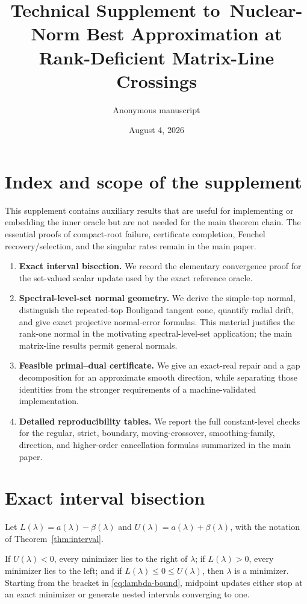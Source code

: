 \documentclass[10pt]{article}
\title{\textbf{Technical Supplement to}\
\textbf{Nuclear-Norm Best Approximation at Rank-Deficient Matrix-Line Crossings}}
\author{Anonymous manuscript}
\date{August 4, 2026}
\begin{document}
\maketitle

\section{Index and scope of the supplement}

This supplement contains auxiliary results that are useful for implementing
or embedding the inner oracle but are not needed for the main theorem chain.
The essential proofs of compact-root failure, certificate completion, Fenchel
recovery/selection, and the singular rates remain in the main paper.

\begin{enumerate}
 \item \textbf{Exact interval bisection.}  We record the elementary
 convergence proof for the set-valued scalar update used by the exact
 reference oracle.
 \item \textbf{Spectral-level-set normal geometry.}  We derive the simple-top
 normal, distinguish the repeated-top Bouligand tangent cone, quantify radial
 drift, and give exact projective normal-error formulas.  This material
 justifies the rank-one normal in the motivating
 spectral-level-set application; the main matrix-line results permit general
 normals.
 \item \textbf{Feasible primal--dual certificate.}  We give an exact-real
 repair and a gap decomposition for an approximate smooth direction, while
 separating those identities from the stronger requirements of a
 machine-validated implementation.
 \item \textbf{Detailed reproducibility tables.}  We report the full
 constant-level checks for the regular, strict, boundary, moving-crossover,
 smoothing-family, direction, and higher-order cancellation formulas
 summarized in the main paper.
\end{enumerate}

\section{Exact interval bisection}

Let \(L(\lambda)=a(\lambda)-\beta(\lambda)\) and
\(U(\lambda)=a(\lambda)+\beta(\lambda)\), with the notation of
Theorem~\ref{thm:interval}.

\begin{proposition}
If \(U(\lambda)<0\), every minimizer lies to the right of \(\lambda\); if
\(L(\lambda)>0\), every minimizer lies to the left; and if
\(L(\lambda)\le0\le U(\lambda)\), then \(\lambda\) is a minimizer.  Starting
from the bracket in \eqref{eq:lambda-bound}, midpoint updates either stop at
an exact minimizer or generate nested intervals converging to one.
\end{proposition}
\end{document}
